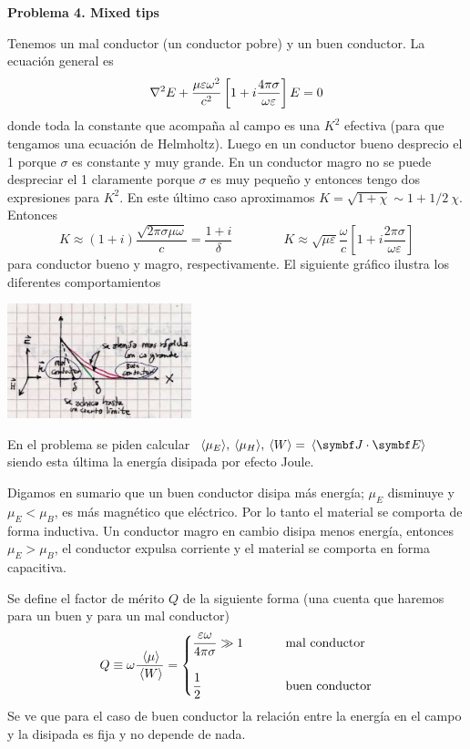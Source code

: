 \documentclass[10pt,oneside]{CBFT_book}
\begin{document}
\begin{ejemplo}{\bf Problema 4. Mixed tips}

Tenemos un mal conductor (un conductor pobre) y un buen conductor.
La ecuación general es
\[
	\nabla^2{E} + \frac{\mu\varepsilon\omega^2}{c^2}
	\left[ 1 + i \frac{4\pi\sigma}{\omega\varepsilon}\right] E =0
\]
donde toda la constante que acompaña al campo es una $K^2$ efectiva (para que tengamos una
ecuación de Helmholtz). Luego en un conductor bueno desprecio el 1 porque $\sigma$ es
constante y muy grande. En un conductor magro no se puede despreciar el 1 claramente porque
$\sigma$ es muy pequeño y entonces tengo dos expresiones para $K^2$. En este último caso
aproximamos $ K = \sqrt{1 + \chi }\sim 1 + 1/2 \:\chi$.
Entonces
\[
	K \approx (1+i)\frac{\sqrt{2\pi\sigma\mu\omega}}{c} = \frac{1+i}{\delta} \qquad \qquad
	K \approx \sqrt{\mu\varepsilon} \frac{\omega}{c}\left[ 1 + i \frac{2\pi\sigma}{\omega\varepsilon}\right]
\]
para conductor bueno y magro, respectivamente.
El siguiente gráfico ilustra los diferentes comportamientos

\includegraphics[width=0.40\textwidth]{images/fig_ft1_problema4A.jpg} 

En el problema se piden calcular
$ \vm{\mu_E}, \vm{\mu_H}, \vm{W} = \vm{\pe{J}{E}}$ siendo esta última la energía disipada
por efecto Joule.

Digamos en sumario que un buen conductor disipa más energía; $\mu_E$ disminuye y
$\mu_E < \mu_B$, es más magnético que eléctrico. Por lo tanto el material se comporta
de forma inductiva. Un conductor magro en cambio disipa menos energía, entonces
$\mu_E > \mu_B$, el conductor expulsa corriente y el material se comporta en forma
capacitiva.

Se define el factor de mérito $Q$ de la siguiente forma (una cuenta que haremos para un
buen y para un mal conductor)
\[
	Q \equiv \omega \frac{ \:\langle \mu \rangle }{ \:\langle W \rangle} =
	\begin{cases}
	\displaystyle \frac{\varepsilon \omega}{4 \pi \sigma} \gg 1 &\qquad \text{ mal conductor } \\
	\\
	\displaystyle \frac{1}{2} &\qquad \text{ buen conductor}
	\end{cases}
\]
Se ve que para el caso de buen conductor la relación entre la energía en el campo y la
disipada es fija y no depende de nada.


\end{ejemplo}
\end{document}
